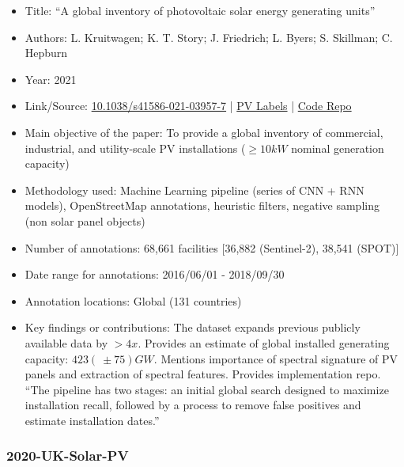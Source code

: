\begin{itemize}
    \item Title: ``A global inventory of photovoltaic solar energy generating units''
    \item Authors: L. Kruitwagen; K. T. Story; J. Friedrich; L. Byers; S. Skillman; C. Hepburn 
    \item Year: 2021
    \item Link/Source: \href{https://doi.org/10.1038/s41586-021-03957-7}{10.1038/s41586-021-03957-7} | 
    \href{https://zenodo.org/records/5005868}{PV Labels} | 
    \href{https://github.com/Lkruitwagen/solar-pv-global-inventory}{Code Repo}
    \item Main objective of the paper: To provide a global inventory of commercial, industrial, and utility-scale PV installations ($\geq 10kW$ nominal generation capacity)
    \item Methodology used: Machine Learning pipeline (series of CNN + RNN models), OpenStreetMap annotations, heuristic filters, negative sampling (non solar panel objects)
    \item Number of annotations: 68,661 facilities [36,882 (Sentinel-2), 38,541 (SPOT)]
    \item Date range for annotations: 2016/06/01 - 2018/09/30
    \item Annotation locations: Global (131 countries)  
    \item Key findings or contributions: The dataset expands previous publicly available data by $> 4x$. Provides an estimate of global installed generating capacity: $423 (~\pm75) GW$. Mentions importance of spectral signature of PV panels and extraction of spectral features. Provides implementation repo. ``The pipeline has two stages: an initial global search designed to maximize installation recall, followed by a process to remove false positives and estimate installation dates.''
\end{itemize}

\subsubsection{2020-UK-Solar-PV}

